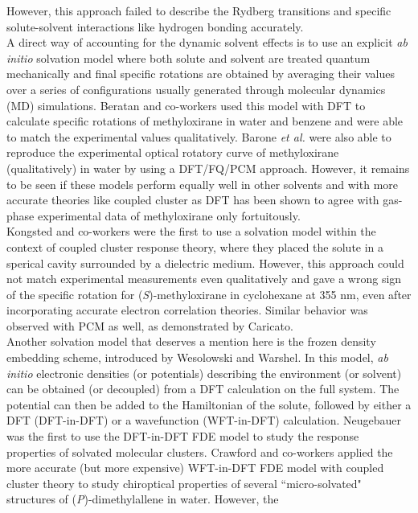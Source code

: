 However, this approach failed to describe the Rydberg transitions and specific solute-solvent interactions like hydrogen bonding accurately.\\
A direct way of accounting for the dynamic solvent effects is to use an explicit {\em ab initio} solvation model where
both solute and solvent are treated quantum mechanically and final specific rotations are obtained by averaging their
values over a series of configurations usually generated through molecular dynamics (MD) simulations. Beratan and co-workers 
used this model with DFT to calculate specific rotations of methyloxirane in water\cite{} and benzene\cite{} and were 
able to match the experimental values qualitatively. Barone {\em et al.}\cite{} were also able to reproduce the experimental optical
rotatory curve of methyloxirane (qualitatively) in water by using a DFT/FQ/PCM approach. However, it remains to be seen if these 
models perform equally well in other solvents and with more accurate theories like coupled cluster as DFT has been shown to agree 
with gas-phase experimental data of methyloxirane only fortuitously\cite{}.\\
Kongsted and co-workers were the first to use a solvation model within the context of coupled cluster response theory,
where they placed the solute in a sperical cavity surrounded by a dielectric medium. However, this approach 
could not match experimental measurements even qualitatively and gave a wrong sign of the specific rotation for ({\em S})-methyloxirane 
in cyclohexane at 355 nm, even after incorporating accurate electron correlation theories\cite{}. Similar behavior was observed 
with PCM as well, as demonstrated by Caricato\cite{}.\\
Another solvation model that deserves a mention here is the frozen density embedding scheme, introduced by Wesolowski and 
Warshel\cite{}. In this model, {\em ab initio} electronic densities (or potentials) describing the environment (or solvent) 
can be obtained (or decoupled) from a DFT calculation on the full system. The potential can then be added to the Hamiltonian
of the solute, followed by either a DFT (DFT-in-DFT) or a wavefunction (WFT-in-DFT) calculation\cite{}. Neugebauer
was the first to use the DFT-in-DFT FDE model to study the response properties of solvated molecular clusters\cite{}. 
Crawford and co-workers\cite{} applied the more accurate (but more expensive) WFT-in-DFT FDE model with coupled cluster theory 
to study chiroptical properties of several ``micro-solvated" structures of ({\em P})-dimethylallene in water. However, the

